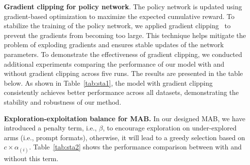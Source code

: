 \documentclass{article}
\theoremstyle{boldremark}
\begin{document}
{\bf Gradient clipping for policy network}. The policy network is updated using gradient-based optimization to maximize the expected cumulative reward. To stabilize the training of the policy network, we applied gradient clipping~\cite{fujita2018clipped} to prevent the gradients from becoming too large. This technique helps mitigate the problem of exploding gradients and ensures stable updates of the network parameters. To demonstrate the effectiveness of gradient clipping, we conducted additional experiments comparing the performance of our model with and without gradient clipping across five runs. The results are presented in the table below. As shown in Table~\ref{tab:sta1}, the model with gradient clipping consistently achieves better performance across all datasets, demonstrating the stability and robustness of our method.

{\bf Exploration-exploitation balance for MAB.} In our designed MAB, we have introduced a penalty term, i.e., $\beta$, to encourage exploration on under-explored arms (i.e., prompt formats), otherwise, it will lead to a greedy selection based on $c\times\alpha_{(i)}$. Table~\ref{tab:sta2} shows the performance comparison between with and without this term.
\end{document}
